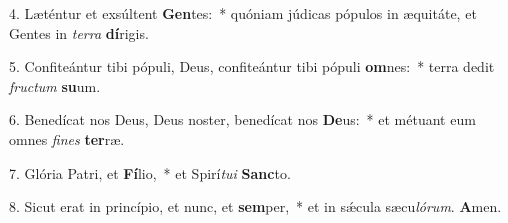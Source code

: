 4. Læténtur et exsúltent \textbf{Gen}tes:~* quóniam júdicas pópulos in æquitáte, et Gentes in \textit{ter}\textit{ra} \textbf{dí}rigis.

5. Confiteántur tibi pópuli, Deus, confiteántur tibi pópuli \textbf{om}nes:~* terra dedit \textit{fruc}\textit{tum} \textbf{su}um.

6. Benedícat nos Deus, Deus noster, benedícat nos \textbf{De}us:~* et métuant eum omnes \textit{fi}\textit{nes} \textbf{ter}ræ.

7. Glória Patri, et \textbf{Fí}lio,~* et Spirí\textit{tu}\textit{i} \textbf{Sanc}to.

8. Sicut erat in princípio, et nunc, et \textbf{sem}per,~* et in s\'{\ae}cula sæcu\textit{ló}\textit{rum}. \textbf{A}men.